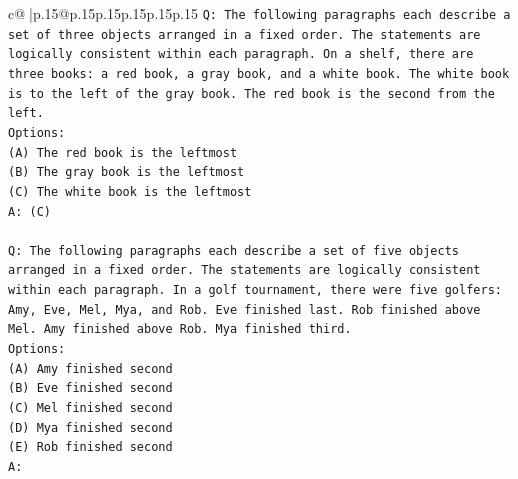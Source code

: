 \documentclass{article}
\begin{document}
{\begin{supertabular}{c@{$\;$}|p{.15\linewidth}@{}p{.15\linewidth}p{.15\linewidth}p{.15\linewidth}p{.15\linewidth}p{.15\linewidth}}
{{{\texttt{Q: The following paragraphs each describe a set of three objects arranged in a fixed order. The statements are logically consistent within each paragraph. On a shelf, there are three books: a red book, a gray book, and a white book. The white book is to the left of the gray book. The red book is the second from the left.} \\
\texttt{Options:} \\
\texttt{(A) The red book is the leftmost} \\
\texttt{(B) The gray book is the leftmost} \\
\texttt{(C) The white book is the leftmost} \\
\texttt{A: (C)} \\
\\ 
\texttt{Q: The following paragraphs each describe a set of five objects arranged in a fixed order. The statements are logically consistent within each paragraph. In a golf tournament, there were five golfers: Amy, Eve, Mel, Mya, and Rob. Eve finished last. Rob finished above Mel. Amy finished above Rob. Mya finished third.} \\
\texttt{Options:} \\
\texttt{(A) Amy finished second} \\
\texttt{(B) Eve finished second} \\
\texttt{(C) Mel finished second} \\
\texttt{(D) Mya finished second} \\
\texttt{(E) Rob finished second} \\
\texttt{A:} \\
            }
        }
    }
     \\ \\


\end{supertabular}}
\end{document}
